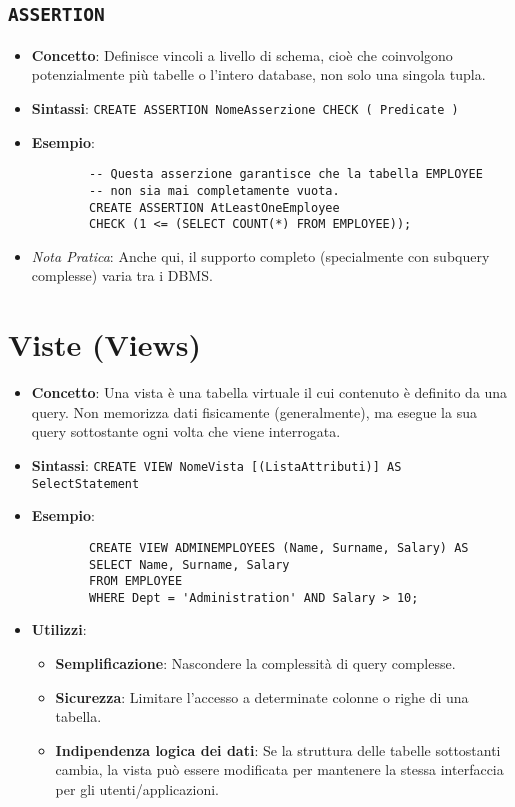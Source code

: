 \documentclass{article}
\begin{document}
	\subsection{\texttt{ASSERTION}}
	\begin{itemize}
		\item \textbf{Concetto}: Definisce vincoli a livello di schema, cioè che coinvolgono potenzialmente più tabelle o l'intero database, non solo una singola tupla.
		\item \textbf{Sintassi}: \texttt{CREATE ASSERTION NomeAsserzione CHECK ( Predicate )}
		\item \textbf{Esempio}:
		\begin{verbatim}
		-- Questa asserzione garantisce che la tabella EMPLOYEE
		-- non sia mai completamente vuota.
		CREATE ASSERTION AtLeastOneEmployee
		CHECK (1 <= (SELECT COUNT(*) FROM EMPLOYEE));
		\end{verbatim}
		\item \textit{Nota Pratica}: Anche qui, il supporto completo (specialmente con subquery complesse) varia tra i DBMS.
	\end{itemize}
	
	\section{Viste (Views)}
	\begin{itemize}
		\item \textbf{Concetto}: Una vista è una tabella virtuale il cui contenuto è definito da una query. Non memorizza dati fisicamente (generalmente), ma esegue la sua query sottostante ogni volta che viene interrogata.
		\item \textbf{Sintassi}: \texttt{CREATE VIEW NomeVista [(ListaAttributi)] AS SelectStatement}
		\item \textbf{Esempio}:
		\begin{verbatim}
		CREATE VIEW ADMINEMPLOYEES (Name, Surname, Salary) AS
		SELECT Name, Surname, Salary
		FROM EMPLOYEE
		WHERE Dept = 'Administration' AND Salary > 10;
		\end{verbatim}
		\item \textbf{Utilizzi}:
		\begin{itemize}
			\item \textbf{Semplificazione}: Nascondere la complessità di query complesse.
			\item \textbf{Sicurezza}: Limitare l'accesso a determinate colonne o righe di una tabella.
			\item \textbf{Indipendenza logica dei dati}: Se la struttura delle tabelle sottostanti cambia, la vista può essere modificata per mantenere la stessa interfaccia per gli utenti/applicazioni.
		\end{itemize}
	\end{itemize}
	
\end{document}
